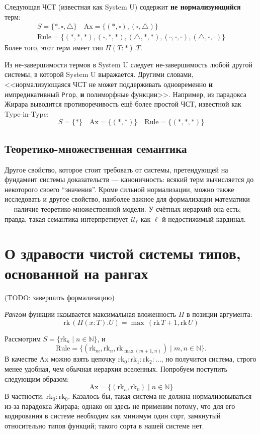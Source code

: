 \begin{theorem}[Girard'72]
Следующая ЧСТ (известная как System U) содержит
\textbf{не нормализующийся} терм:
\[\begin{array}{c}
    S=\{*,\square,\triangle\}
    \quad\mathrm{Ax}=\{
        (*,\square),(\square,\triangle)
    \}
    \\ \mathrm{Rule}=\{
        (*,*,*),(\square,*,*),(\triangle,*,*),
        (\square,\square,\square),
        (\triangle,\square,\square)
    \}
\end{array}\]
Более того, этот терм имеет тип $\Pi(T:*).T$.
\end{theorem}

Из не-завершимости термов в System U следует
не-завершимость любой другой системы, в которой
System U выражается. Другими словами, <<нормализующаяся
ЧСТ не может поддерживать одновременно \textbf{и}
импредикативный \texttt{Prop}, \textbf{и} полиморфные
функции>>. Например, из парадокса Жирара выводится
противоречивость ещё более простой ЧСТ, известной как
Type-in-Type:
\[S=\{*\}\quad\mathrm{Ax}=\{(*,*)\}\quad
\mathrm{Rule}=\{(*,*,*)\}\]

\subsection{Теоретико-множественная семантика}
Другое свойство, которое стоит
требовать от системы, претендующей на фундамент системы
доказательств --- каноничность: всякий терм вычисляется
до некоторого своего ``значения''. 
Кроме сильной нормализации, можно также исследовать и
другое свойство, наиболее важное для формализации
математики --- наличие теоретико-множественной модели.
У счётных иерархий она есть; правда, такая семантика
интерпретирует $\mathcal{U}_\ell$ как $\ell$-й
недостижимый кардинал.

\section{О здравости чистой системы типов, основанной
на рангах}

(TODO: завершить формализацию)

\begin{definition}
    \emph{Рангом} функции называется максимальная
    вложенность $\Pi$ в позиции аргумента:
    \[\mathrm{rk}\,(\Pi(x:T).U)=
        \max\,(\mathrm{rk}\,T+1,\mathrm{rk}\,U)\]
\end{definition}

Рассмотрим $S=\{\mathrm{rk}_n\;|\;n\in\mathbb{N}\}$, и
\[
    \mathrm{Rule}=\{(\mathrm{rk}_m,\mathrm{rk}_n,
    \mathrm{rk}_{\max(m+1,n)})\;|\;m,n\in\mathbb{N}\}.
\]
В качестве $\mathrm{Ax}$ можно взять цепочку
$\mathrm{rk}_0:\mathrm{rk}_1:\mathrm{rk}_2:\ldots$, но
получится система, строго менее удобная, чем обычная
иерархия вселенных. Попробуем поступить следующим
образом:
\[\mathrm{Ax}=\{(\mathrm{rk}_n,\mathrm{rk}_0)\;|\;
    n\in\mathbb{N}\}\]
В частности, $\mathrm{rk}_0:\mathrm{rk}_0$. Казалось
бы, такая система не должна нормализовываться из-за
парадокса Жирара; однако он здесь не применим потому,
что для его кодирования в системе необходим как минимум
один сорт, замкнутый относительно типов функций; такого
сорта в нашей системе нет.

